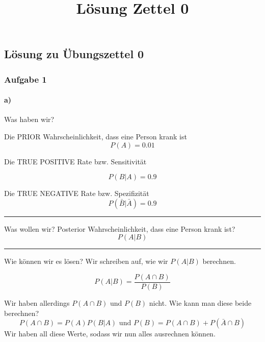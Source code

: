 \documentclass[
]{article}
\title{Lösung Zettel 0}
\author{}
\date{\vspace{-2.5em}}
\begin{document}
\maketitle

\hypertarget{luxf6sung-zu-uxfcbungszettel-0}{%
\subsection{Lösung zu Übungszettel
0}\label{luxf6sung-zu-uxfcbungszettel-0}}

\hypertarget{aufgabe-1}{%
\subsubsection{Aufgabe 1}\label{aufgabe-1}}

\hypertarget{a}{%
\paragraph{a)}\label{a}}

Was haben wir?

Die PRIOR Wahrscheinlichkeit, dass eine Person krank ist
\begin{equation}
  P(A) = 0.01 
\end{equation}

Die TRUE POSITIVE Rate bzw. Sensitivität

\begin{equation}
  P(B | A) = 0.9 
\end{equation}

Die TRUE NEGATIVE Rate bzw. Spezifizität \begin{equation}
  P(\bar{B} | \bar{A}) = 0.9 
\end{equation}

\begin{center}\rule{0.5\linewidth}{0.5pt}\end{center}

Was wollen wir? Posterior Wahrscheinlichkeit, dass eine Person krank
ist? \[
  P(A | B)
\]

\begin{center}\rule{0.5\linewidth}{0.5pt}\end{center}

Wie können wir es lösen? Wir schreiben auf, wie wir \(P(A | B)\)
berechnen.

\[
  P(A | B) = \dfrac{P(A \cap B)}{P(B)}
\]

Wir haben allerdings \(P(A \cap B)\) und \(P(B)\) nicht. Wie kann man
diese beide berechnen? \[
  P(A \cap B) = P(A) P(B | A) \text{ und } P(B) = P(A \cap B) + P(\bar A \cap B)
\] Wir haben all diese Werte, sodass wir nun alles ausrechnen können.
\end{document}

